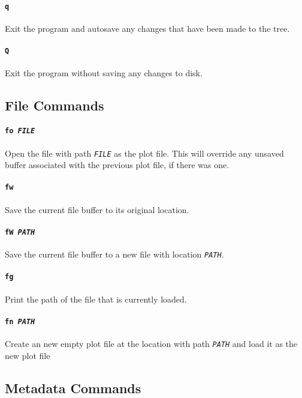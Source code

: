 \documentclass[a4paper]{article}
\begin{document}
\paragraph{\texttt{q}}
Exit the program and autosave any changes that have been made to the tree.

\paragraph{\texttt{Q}}
Exit the program without saving any changes to disk.

\subsection{File Commands}

\paragraph{\texttt{fo \textit{FILE}}}
Open the file with path \texttt{\textit{FILE}} as the plot file. This will 
override any unsaved buffer associated with the previous plot file, if 
there was one.

\paragraph{\texttt{fw}}
Save the current file buffer to its original location.

\paragraph{\texttt{fW \textit{PATH}}}
Save the current file buffer to a new file with location 
\texttt{\textit{PATH}}.

\paragraph{\texttt{fg}}
Print the path of the file that is currently loaded.

\paragraph{\texttt{fn \textit{PATH}}}
Create an new empty plot file at the location with path \texttt{\textit{PATH}} 
and load it as the new plot file

\subsection{Metadata Commands}
\end{document}
